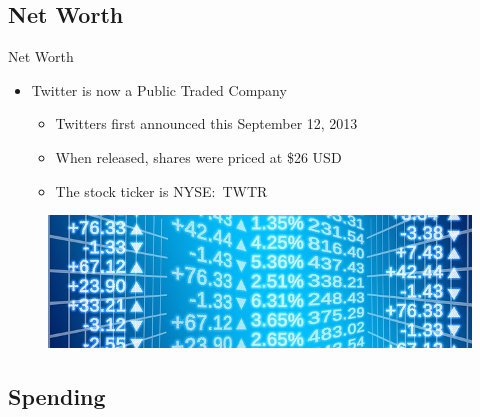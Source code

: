 \documentclass[xcolor=svgnames,handout]{beamer}
\begin{document}
\subsection{Net Worth}

\begin{frame}{Net Worth}
	\begin{itemize}
		\item Twitter is now a Public Traded Company
			\begin{itemize}
				\item Twitters first announced this September 12, 2013~\cite{leokelion2013}
				\item When released, shares were priced at \$26 USD~\cite{aaronpressman2013}
				\item The stock ticker is NYSE:~TWTR~\cite{nyse2016}
			\end{itemize}
	\end{itemize}
	\begin{figure}[h]
		\centering
		\includegraphics[scale=0.25]{stock-market.jpg}
		\caption{\cite{geraltUnknown}}
	\end{figure}
\end{frame}

\subsection{Spending}
\end{document}
